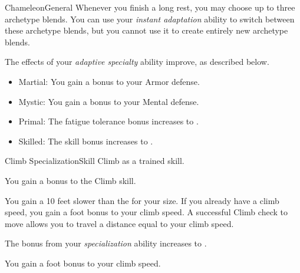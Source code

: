 \begin{feat}{Chameleon}{General}
        Whenever you finish a long rest, you may choose up to three archetype blends.
        You can use your \textit{instant adaptation} ability to switch between these archetype blends, but you cannot use it to create entirely new archetype blends.

         The effects of your \textit{adaptive specialty} ability improve, as described below.
        \begin{itemize}
            \item Martial: You gain a  bonus to your Armor defense.
            \item Mystic: You gain a  bonus to your Mental defense.
            \item Primal: The fatigue tolerance bonus increases to .
            \item Skilled: The skill bonus increases to .
        \end{itemize}
    \end{feat}

    \begin{feat}{Climb Specialization}{Skill}
        \featpre Climb as a trained skill.

         You gain a  bonus to the Climb skill.

         You gain a  10 feet slower than the  for your size.
        If you already have a climb speed, you gain a  foot bonus to your climb speed.
        A successful Climb check to move allows you to travel a distance equal to your climb speed.

         The bonus from your \textit{specialization} ability increases to .

         You gain a  foot bonus to your climb speed.
    \end{feat}

